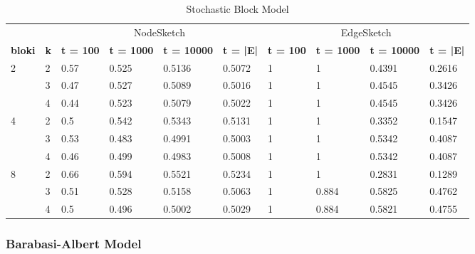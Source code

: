     \begin{table}[!ht]
        \centering
        \begin{tabular}{|l|l|l|l|l|l|l|l|l|l|}
        \hline
            & & \multicolumn{4}{c|}{NodeSketch} & \multicolumn{4}{c|}{EdgeSketch} \\ \cline{1-10}
            \textbf{bloki} & \textbf{k} & \textbf{t = 100} & \textbf{t = 1000} & \textbf{t = 10000} & \textbf{t = |E|} & \textbf{t = 100} & \textbf{t = 1000} & \textbf{t = 10000} & \textbf{t = |E|} \\ \hline\hline
            \multirow{3}{*}{2} & 2 & 0.57 & 0.525 & 0.5136 & 0.5072 & 1 & 1 & 0.4391 & 0.2616 \\ \cline{2-10}
             & 3 & 0.47 & 0.527 & 0.5089 & 0.5016 & 1 & 1 & 0.4545 & 0.3426 \\ \cline{2-10}
             & 4 & 0.44 & 0.523 & 0.5079 & 0.5022 & 1 & 1 & 0.4545 & 0.3426 \\ \hline\hline
            \multirow{3}{*}{4} & 2 & 0.5 & 0.542 & 0.5343 & 0.5131 & 1 & 1 & 0.3352 & 0.1547 \\ \cline{2-10}
             & 3 & 0.53 & 0.483 & 0.4991 & 0.5003 & 1 & 1 & 0.5342 & 0.4087 \\ \cline{2-10}
             & 4 & 0.46 & 0.499 & 0.4983 & 0.5008 & 1 & 1 & 0.5342 & 0.4087 \\ \hline\hline
            \multirow{3}{*}{8} & 2 & 0.66 & 0.594 & 0.5521 & 0.5234 & 1 & 1 & 0.2831 & 0.1289 \\ \cline{2-10}
             & 3 & 0.51 & 0.528 & 0.5158 & 0.5063 & 1 & 0.884 & 0.5825 & 0.4762 \\ \cline{2-10}
             & 4 & 0.5 & 0.496 & 0.5002 & 0.5029 & 1 & 0.884 & 0.5821 & 0.4755 \\ \hline
        \end{tabular}
        \caption{Stochastic Block Model}
    \end{table}

    \subsubsection{Barabasi-Albert Model}

